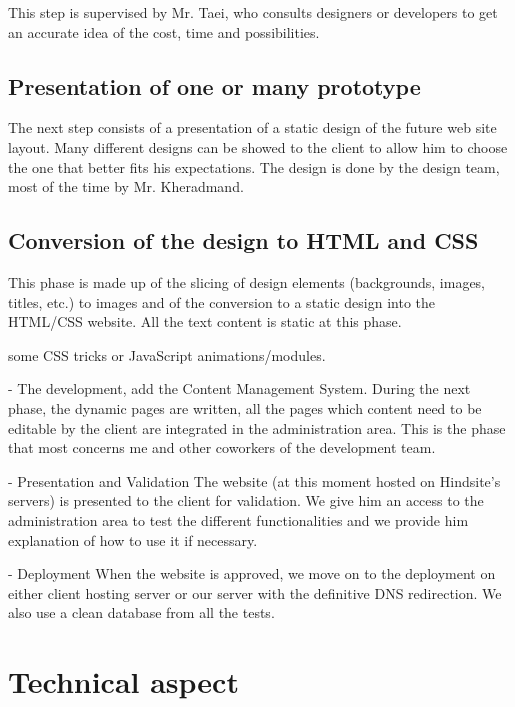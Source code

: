 This step is supervised by Mr. Taei, who consults designers or developers to
get an accurate idea of the cost, time and possibilities.

\subsection{Presentation of one or many prototype}
The next step consists of a presentation of a static design of the future web
site layout. Many different designs can be showed to the client to allow him to
choose the one that better fits his expectations.
The design is done by the design team, most of the time by Mr. Kheradmand.

\subsection{Conversion of the design to HTML and CSS}
This phase is made up of the slicing of design elements (backgrounds,
images, titles, etc.) to images and of the conversion to a static design into the
HTML/CSS website. All the text content is static at this phase.

some CSS tricks or JavaScript animations/modules.

- The development, add the Content Management System.
During the next phase, the dynamic pages are written, all the pages which
content need to be editable by the client are integrated in the administration
area. This is the phase that most concerns me and other coworkers of the
development team.

- Presentation and Validation
The website (at this moment hosted on Hindsite’s servers) is presented to the
client for validation. We give him an access to the administration area to test
the different functionalities and we provide him explanation of how to use it if
necessary.

- Deployment
When the website is approved, we move on to the deployment on either client
hosting server or our server with the definitive DNS redirection. We also use a
clean database from all the tests.

\section{Technical aspect}

